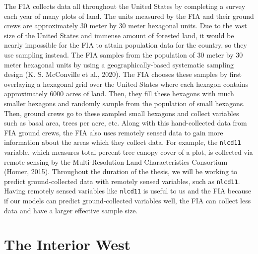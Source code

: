 \documentclass[12pt,twoside]{reedthesis}
\begin{document}
The FIA collects data all throughout the United States by completing a survey each year of many plots of land. The units measured by the FIA and their ground crews are approximately 30 meter by 30 meter hexagonal units. Due to the vast size of the United States and immense amount of forested land, it would be nearly impossible for the FIA to attain population data for the country, so they use sampling instead. The FIA samples from the population of 30 meter by 30 meter hexagonal units by using a geographically-based systematic sampling design (K. S. McConville et al., 2020). The FIA chooses these samples by first overlaying a hexagonal grid over the United States where each hexagon contains approximately 6000 acres of land. Then, they fill these hexagons with much smaller hexagons and randomly sample from the population of small hexagons. Then, ground crews go to these sampled small hexagons and collect variables such as basal area, trees per acre, etc. Along with this hand-collected data from FIA ground crews, the FIA also uses remotely sensed data to gain more information about the areas which they collect data. For example, the \texttt{nlcd11} variable, which measures total percent tree canopy cover of a plot, is collected via remote sensing by the Multi-Resolution Land Characteristics Consortium (Homer, 2015). Throughout the duration of the thesis, we will be working to predict ground-collected data with remotely sensed variables, such as \texttt{nlcd11}. Having remotely sensed variables like \texttt{nlcd11} is useful to us and the FIA because if our models can predict ground-collected variables well, the FIA can collect less data and have a larger effective sample size.

\hypertarget{the-interior-west}{%
\section{The Interior West}\label{the-interior-west}}
\end{document}
